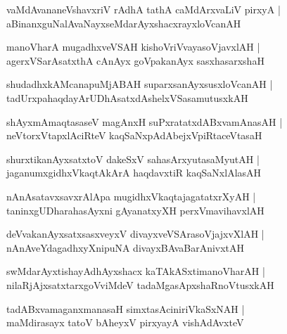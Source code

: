 \documentclass[twoside,12pt,openright]{book}
\newcounter{shloka}[chapter]
\begin{document}
\begin{shloka}%
vaMdAvananeVshavxriV rAdhA tathA caMdArxvaLiV pirxyA |\\
aBinanxguNalAvaNayxseMdarAyxshacxrayxloVcanAH 
\end{shloka}

\begin{shloka}%
manoVharA mugadhxveVSAH kishoVriVvayasoVjavxlAH |\\
agerxVSarAsatxthA cAnAyx goVpakanAyx sasxhasarxshaH 
\end{shloka}

\begin{shloka}%
shudadhxkAMcanapuMjABAH suparxsanAyxsusxloVcanAH |\\
tadUrxpahaqdayArUDhAsatxdAshelxVSasamutusxkAH 
\end{shloka}

\begin{shloka}%
shAyxmAmaqtasaseV magAnxH suPxratatxdABxvamAnasAH |\\
neVtorxVtapxlAciRteV kaqSaNxpAdAbejxVpiRtaceVtasaH 
\end{shloka}

\begin{shloka}%
shurxtikanAyxsatxtoV dakeSxV sahasArxyutasaMyutAH |\\
jaganumxgidhxVkaqtAkArA haqdavxtiR kaqSaNxlAlasAH 
\end{shloka}

\begin{shloka}%
nAnAsatavxsavxrAlApa mugidhxVkaqtajagatatxrXyAH |\\
taninxgUDharahasAyxni gAyanatxyXH perxVmavihavxlAH 
\end{shloka}

\begin{shloka}%
deVvakanAyxsatxsasxveyxV divayxveVSArasoVjajxvXlAH |\\
nAnAveYdagadhxyXnipuNA divayxBAvaBarAnivxtAH
\end{shloka}

\begin{shloka}%
swMdarAyxtishayAdhAyxshacx kaTAkASxtimanoVharAH |\\
nilaRjAjxsatxtarxgoVviMdeV tadaMgasApxshaRnoVtusxkAH 
\end{shloka}

\begin{shloka}%
tadABxvamaganxmanasaH simxtasAciniriVkaSxNAH |\\
maMdirasayx tatoV bAheyxV pirxyayA vishAdAvxteV 
\end{shloka}
\end{document}
